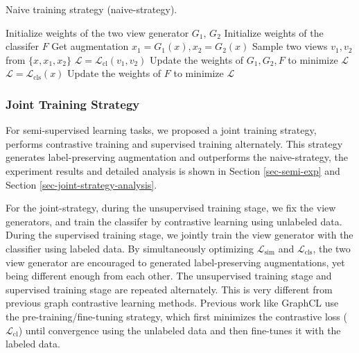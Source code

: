 \setlength{\textfloatsep}{10pt} %
\begin{algorithm}[tb]
\begin{small}
    \caption{Naive training strategy (naive-strategy).}
        \begin{algorithmic}[1]
            \State Initialize weights of the two view generator $G_1$, $G_2$
            \State Initialize weights of the classifer $F$
                    \State Get augmentation $x_1 = G_1(x), x_2 = G_2(x)$
                    \State Sample two views $v_1, v_2$ from $\{x, x_1, x_2\}$
                    \State $\mathcal{L} = \mathcal{L}_{\text{cl}} (v_1, v_2)$
                    \State Update the weights of $G_1, G_2, F$ to minimize $\mathcal{L}$
                \EndFor
            \EndWhile
                    \State $\mathcal{L} = \mathcal{L}_{\text{cls}}(x)$
                    \State Update the weights of $F$ to minimize $\mathcal{L}$
                \EndFor
            \EndWhile
        \end{algorithmic}
    \label{algo-naive}
\end{small}
\vspace{-0.1cm}
\end{algorithm}

\subsubsection{Joint Training Strategy}

For semi-supervised learning tasks, we proposed a joint training strategy, performs contrastive training and supervised training alternately. This strategy generates label-preserving augmentation and outperforms the naive-strategy, the experiment results and detailed analysis is shown in Section \ref{sec-semi-exp} and Section \ref{sec-joint-strategy-analysis}.

For the joint-strategy, during the unsupervised training stage, we fix the view generators, and train the classifer by contrastive learning using unlabeled data. During the supervised training stage, we jointly train the view generator with the classifier using labeled data. By simultaneously optimizing $\mathcal{L}_{\text{sim}}$ and $\mathcal{L}_{\text{cls}}$, the two view generator are encouraged to generated label-preserving augmentations, yet being different enough from each other. The unsupervised training stage and supervised training stage are repeated alternately. This is very different from previous graph contrastive learning methods. Previous work like GraphCL \cite{you2020graphcl} use the pre-training/fine-tuning strategy, which first minimizes the contrastive loss ($\mathcal{L}_{\text{cl}}$) until convergence using the unlabeled data and then fine-tunes it with the labeled data. 

